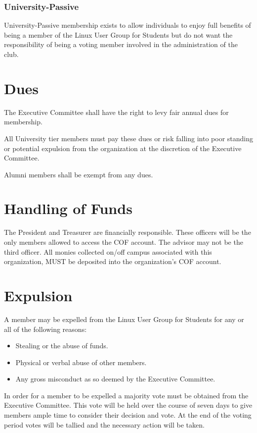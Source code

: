 \documentclass[letter]{report}
\begin{document}
\subsubsection{University-Passive}
University-Passive membership exists to allow individuals to enjoy full benefits
of being a member of the Linux User Group for Students but do not want the responsibility of
being a voting member involved in the administration of the club.

\section{Dues}
The Executive Committee shall have the right to levy fair annual dues for
membership.

All University tier members must pay these dues or risk falling into poor
standing or potential expulsion from the organization at the discretion of the
Executive Committee.

Alumni members shall be exempt from any dues.

\section{Handling of Funds}
The President and Treasurer are financially responsible. These officers will be
the only members allowed to access the COF account. The advisor may not be the
third officer. All monies collected on/off campus associated with this
organization, MUST be deposited into the organization’s COF account.

\section{Expulsion}
A member may be expelled from the Linux User Group for Students for any or all of the
following reasons:
\begin{itemize}
	\item Stealing or the abuse of funds.
	\item Physical or verbal abuse of other members.
	\item Any gross misconduct as so deemed by the Executive Committee.
\end{itemize}
In order for a member to be expelled a majority vote must be obtained from the
Executive Committee. This vote will be held over the course of seven days to
give members ample time to consider their decision and vote. At the end of the
voting period votes will be tallied and the necessary action will be taken.
\end{document}
